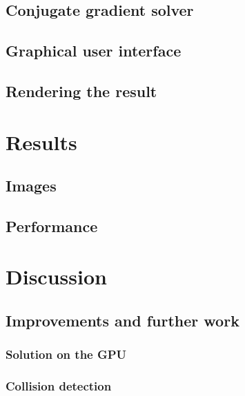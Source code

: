 \documentclass[10pt,a4paper]{article}
\begin{document}
\subsection{Conjugate gradient solver}

\subsection{Graphical user interface}

\subsection{Rendering the result}


\section{Results}
\subsection{Images}

\subsection{Performance}

\section{Discussion}
\subsection{Improvements and further work}
\subsubsection{Solution on the GPU}


\subsubsection{Collision detection}


\pagebreak
{} 


\end{document}
